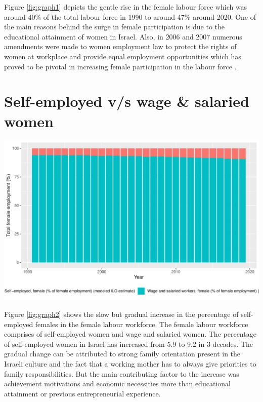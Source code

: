 \documentclass[11pt,a4paper,]{article}
\let\origfigure\figure
\let\endorigfigure\endfigure
\renewenvironment{figure}[1][2] {
    \expandafter\origfigure\expandafter[H]
} {
    \endorigfigure
}%
\begin{document}
Figure \ref{fig:graph1} depicts the gentle rise in the female labour
force which was around 40\% of the total labour force in 1990 to around
47\% around 2020. One of the main reasons behind the surge in female
participation is due to the educational attainment of women in Israel.
Also, in 2006 and 2007 numerous amendments were made to women employment
law to protect the rights of women at workplace and provide equal
employment opportunities which has proved to be pivotal in increasing
female participation in the labour force
\autocite{israelministryofforeignaffairs2013}.

\section{Self-employed v/s wage \& salaried
women}\label{self-employed-vs-wage-salaried-women}

\begin{figure}
\centering
\includegraphics{report_files/figure-latex/graph2-1.pdf}
\caption{\label{fig:graph2}Self-employed v/s Wage \& salaried female
workers}
\end{figure}

Figure \ref{fig:graph2} shows the slow but gradual increase in the
percentage of self-employed females in the female labour workforce. The
female labour workforce comprises of self-employed women and wage and
salaried women. The percentage of self-employed women in Israel has
increased from 5.9 to 9.2 in 3 decades. The gradual change can be
attributed to strong family orientation present in the Israeli culture
and the fact that a working mother has to always give priorities to
family responsibilities. But the main contributing factor to the
increase was achievement motivations and economic necessities more than
educational attainment or previous entrepreneurial experience.
\textcite{lerner1997israeli}
\end{document}
